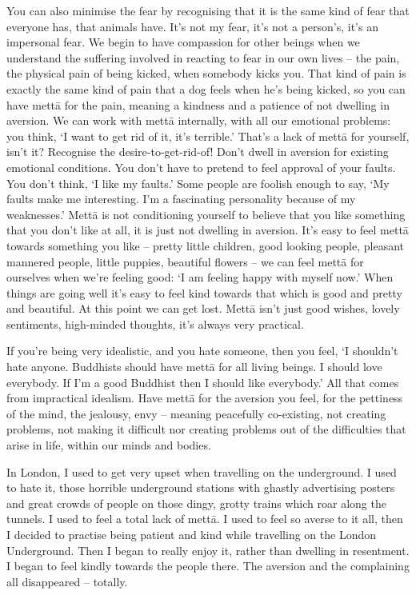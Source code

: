 You can also minimise the fear by recognising that it is the same kind of fear that everyone has, that animals have. It's not my fear, it's not a person's, it's an impersonal fear. We begin to have compassion for other beings when we understand the suffering involved in reacting to fear in our own lives -- the pain, the physical pain of being kicked, when somebody kicks you. That kind of pain is exactly the same kind of pain that a dog feels when he's being kicked, so you can have mettā for the pain, meaning a kindness and a patience of not dwelling in aversion. We can work with mettā internally, with all our emotional problems: you think, `I want to get rid of it, it's terrible.' That's a lack of mettā for yourself, isn't it? Recognise the desire-to-get-rid-of! Don't dwell in aversion for existing emotional conditions. You don't have to pretend to feel approval of your faults. You don't think, `I like my faults.' Some people are foolish enough to say, `My faults make me interesting. I'm a fascinating personality because of my weaknesses.' Mettā is not conditioning yourself to believe that you like something that you don't like at all, it is just not dwelling in aversion. It's easy to feel mettā towards something you like -- pretty little children, good looking people, pleasant mannered people, little puppies, beautiful flowers -- we can feel mettā for ourselves when we're feeling good: `I am feeling happy with myself now.' When things are going well it's easy to feel kind towards that which is good and pretty and beautiful. At this point we can get lost. Mettā isn't just good wishes, lovely sentiments, high-minded thoughts, it's always very practical.

If you're being very idealistic, and you hate someone, then you feel, `I shouldn't hate anyone. Buddhists should have mettā for all living beings. I should love everybody. If I'm a good Buddhist then I should like everybody.' All that comes from impractical idealism. Have mettā for the aversion you feel, for the pettiness of the mind, the jealousy, envy -- meaning peacefully co-existing, not creating problems, not making it difficult nor creating problems out of the difficulties that arise in life, within our minds and bodies.

In London, I used to get very upset when travelling on the underground. I used to hate it, those horrible underground stations with ghastly advertising posters and great crowds of people on those dingy, grotty trains which roar along the tunnels. I used to feel a total lack of mettā. I used to feel so averse to it all, then I decided to practise being patient and kind while travelling on the London Underground. Then I began to really enjoy it, rather than dwelling in resentment. I began to feel kindly towards the people there. The aversion and the complaining all disappeared -- totally.

